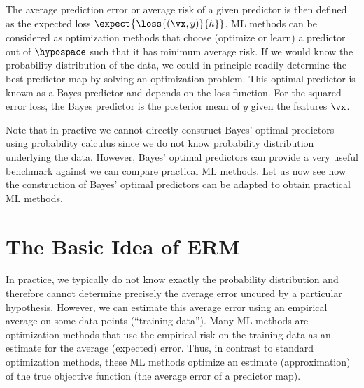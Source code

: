 \documentclass[12pt]{report}
\begin{document}
The average prediction error or average risk of a given predictor is then defined as the expected loss 
$\expect \big \{ \loss{(\vx,y)}{h} \}$. ML methods can be considered as optimization methods that choose 
(optimize or learn) a predictor out of $\hypospace$ such that it has minimum average risk. If we would 
know the probability distribution of the data, we could in principle readily determine the best predictor 
map by solving an optimization problem. This optimal predictor is known as a Bayes predictor and depends 
on the loss function. For the squared error loss, the Bayes predictor is the posterior mean of $y$ given the 
features $\vx$. 

Note that in practive we cannot directly construct Bayes' optimal predictors using probability calculus since 
we do not know probability distribution underlying the data. However, Bayes' optimal predictors can provide 
a very useful benchmark against we can compare practical ML methods. Let us now see how the construction 
of Bayes' optimal predictors can be adapted to obtain practical ML methods. 



\section{The Basic Idea of ERM} 

In practice, we typically do not know exactly the probability distribution and therefore cannot determine 
precisely the average error uncured by a particular hypothesis. However, we can estimate this 
average error using an empirical average on some data points (``training data''). 
Many ML methods are optimization methods that use the empirical risk on the training data 
as an estimate for the average (expected) error. Thus, in contrast to standard optimization methods, 
these ML methods optimize an estimate (approximation) of the true objective function 
(the average error of a predictor map).  
\end{document}
